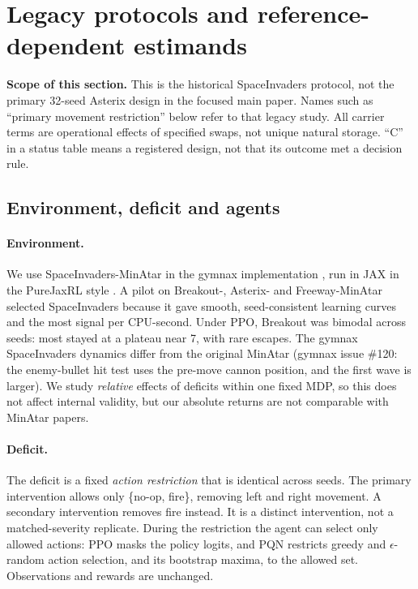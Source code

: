 \documentclass[10pt]{article} %
\begin{document}
\section{Legacy protocols and reference-dependent estimands}\label{sec:protocol}

\noindent\textbf{Scope of this section.} This is the historical SpaceInvaders protocol, not the primary 32-seed Asterix design in the focused main paper. Names such as ``primary movement restriction'' below refer to that legacy study. All carrier terms are operational effects of specified swaps, not unique natural storage. ``C'' in a status table means a registered design, not that its outcome met a decision rule.

\subsection{Environment, deficit and agents}

\paragraph{Environment.}
We use SpaceInvaders-MinAtar \citep{young2019minatar} in the gymnax implementation \citep{lange2022gymnax}, run in JAX in the PureJaxRL style \citep{lu2022discovered}. A pilot on Breakout-, Asterix- and Freeway-MinAtar selected SpaceInvaders because it gave smooth, seed-consistent learning curves and the most signal per CPU-second. Under PPO, Breakout was bimodal across seeds: most stayed at a plateau near 7, with rare escapes. The gymnax SpaceInvaders dynamics differ from the original MinAtar (gymnax issue \#120: the enemy-bullet hit test uses the pre-move cannon position, and the first wave is larger). We study \emph{relative} effects of deficits within one fixed MDP, so this does not affect internal validity, but our absolute returns are not comparable with MinAtar papers.

\paragraph{Deficit.}
The deficit is a fixed \emph{action restriction} that is identical across seeds. The primary intervention allows only \{no-op, fire\}, removing left and right movement. A secondary intervention removes fire instead. It is a distinct intervention, not a matched-severity replicate. During the restriction the agent can select only allowed actions: PPO masks the policy logits, and PQN restricts greedy and $\epsilon$-random action selection, and its bootstrap maxima, to the allowed set. Observations and rewards are unchanged.
\end{document}
